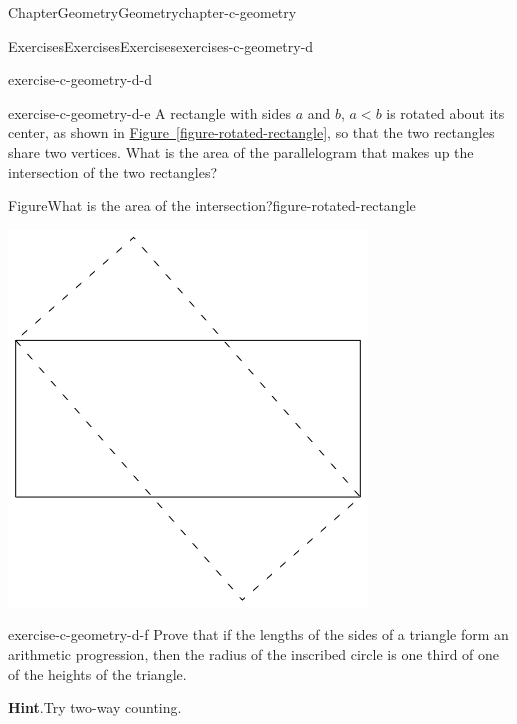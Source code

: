 \documentclass[oneside,10pt,]{book}
\newcommand{\blocktitlefont}{\relax}
\newcommand{\xreffont}{\relax}
\numberwithin{equation}{section}
\newcommand{\lt}{<}
\begin{document}
\begin{chapterptx}{Chapter}{Geometry}{}{Geometry}{}{}{chapter-c-geometry}
\begin{exercises-section}{Exercises}{Exercises}{}{Exercises}{}{}{exercises-c-geometry-d}
\begin{divisionexercise}{3}{}{}{exercise-c-geometry-d-d}
\end{divisionexercise}%
\begin{divisionexercise}{4}{}{}{exercise-c-geometry-d-e}%
A rectangle with sides \(a\) and \(b\), \(a \lt b\) is rotated about its center, as shown in \hyperref[figure-rotated-rectangle]{Figure~{\xreffont\ref{figure-rotated-rectangle}}}, so that the two rectangles share two vertices. What is the area of the parallelogram that makes up the intersection of the two rectangles?%
\begin{figureptx}{Figure}{What is the area of the intersection?}{figure-rotated-rectangle}{}%
\begin{image}{0.2}{0.6}{0.2}{}%
\includegraphics[width=\linewidth]{images/rotated-rectangle.png}
\end{image}%
\tcblower
\end{figureptx}%
\end{divisionexercise}%
\begin{divisionexercise}{5}{}{}{exercise-c-geometry-d-f}%
Prove that if the lengths of the sides of a triangle form an arithmetic progression, then the radius of the inscribed circle is one third of one of the heights of the triangle.%
\par\smallskip%
\noindent\textbf{\blocktitlefont Hint}.\hypertarget{hint-c-geometry-d-f-b}{}\quad{}Try two-way counting.%

\end{divisionexercise}
\end{exercises-section}
\end{chapterptx}
\end{document}
